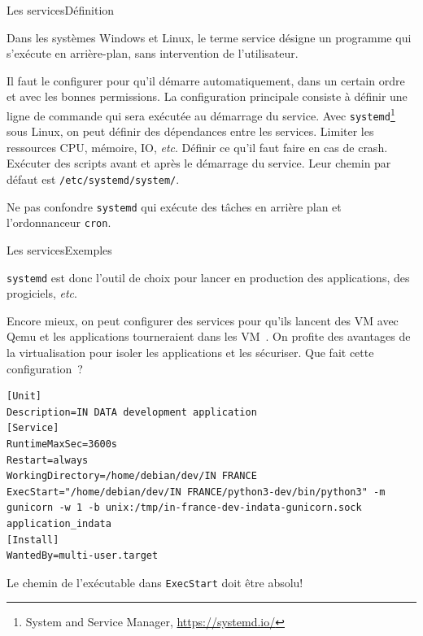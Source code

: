 \documentclass{beamer}
\begin{document}
    \begin{frame}{Les services}{Définition}
        \begin{footnotesize}
            Dans les systèmes Windows et Linux, le terme service désigne un programme qui s'exécute en arrière-plan, sans intervention de l'utilisateur.

            Il faut le configurer pour qu'il démarre automatiquement, dans un certain ordre et avec les bonnes permissions.
            \bigbreak
            La configuration principale consiste à définir une ligne de commande qui sera exécutée au démarrage du service.
            \bigbreak
            Avec \lstinline{systemd}\footnote{System and Service Manager, \url{https://systemd.io/}} sous Linux, on peut définir des dépendances entre les services.
            Limiter les ressources CPU, mémoire, IO, \textit{etc}.
            Définir ce qu'il faut faire en cas de crash.
            Exécuter des scripts avant et après le démarrage du service.
            \bigbreak
            Leur chemin par défaut est \lstinline{/etc/systemd/system/}.
            \begin{dangercolorbox}
                Ne pas confondre \lstinline{systemd} qui exécute des tâches en arrière plan et l'ordonnanceur \lstinline{cron}.
            \end{dangercolorbox}
        \end{footnotesize}
    \end{frame}

    \begin{frame}[fragile]{Les services}{Exemples}
        \begin{small}
            \lstinline{systemd} est donc l'outil de choix pour lancer en production des applications, des progiciels, \textit{etc}.

            Encore mieux, on peut configurer des services pour qu'ils lancent des VM avec Qemu et les applications tourneraient dans les VM~.
            On profite des avantages de la virtualisation pour isoler les applications et les sécuriser.
            \bigbreak
            Que fait cette configuration~?
            \begin{lstlisting}
[Unit]
Description=IN DATA development application
[Service]
RuntimeMaxSec=3600s
Restart=always
WorkingDirectory=/home/debian/dev/IN FRANCE
ExecStart="/home/debian/dev/IN FRANCE/python3-dev/bin/python3" -m gunicorn -w 1 -b unix:/tmp/in-france-dev-indata-gunicorn.sock application_indata
[Install]
WantedBy=multi-user.target
            \end{lstlisting}
            \begin{dangercolorbox}
                Le chemin de l'exécutable dans \lstinline{ExecStart} doit être absolu!
            \end{dangercolorbox}
        \end{small}
    \end{frame}
\end{document}
